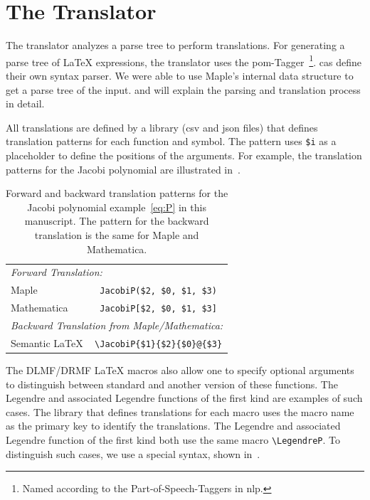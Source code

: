 \documentclass[a4paper,11pt]{article}
\newcommand{\DLMF}{DLMF}
\newcommand{\DRMF}{DRMF}
\newcommand{\Maple}{Maple}
\newcommand{\Mathematica}{Mathematica}
\newcommand{\Macro}{\DLMF/\DRMF{} \LaTeX{} macro}
\theoremstyle{defTheoStyle}
\theoremstyle{defExampStyle}
\begin{document}
\section{The Translator}
The translator analyzes a parse tree to perform translations. For generating a parse tree of \LaTeX{} expressions, the translator uses the \gls*{pom}-Tagger~\parencite{POM-Tagger}\footnote{Named according to the Part-of-Speech-Taggers in \gls*{nlp}.}. \gls*{cas} define their own syntax parser. We were able to use \Maple's internal data structure to get a parse tree of the input.  and  will explain the parsing and translation process in detail.

All translations are defined by a library (\gls*{csv} and \gls*{json} files) that defines translation patterns for each function and symbol. The pattern uses \verb|$i| as a placeholder to define the positions of the arguments. For example, the translation patterns for the Jacobi polynomial are illustrated in~.

\begin{table}[ht]
	\centering
	\begin{tabular}{lc}
		\hline
		\multicolumn{2}{l}{\textit{Forward Translation:}} \\
		\Maple & \verb|JacobiP($2, $0, $1, $3)| \\
		\Mathematica & \verb|JacobiP[$2, $0, $1, $3]|\\
		\hline
		\multicolumn{2}{l}{\textit{Backward Translation from \Maple/\Mathematica:}} \\
		Semantic \LaTeX & \verb|\JacobiP{$1}{$2}{$0}@{$3}|\\
		\hline
	\end{tabular}
	\caption{Forward and backward translation patterns for the Jacobi polynomial example~\eqref{eq:P} in this manuscript. The pattern for the backward translation is the same for \Maple{} and \Mathematica.}
	\label{tab:placeholder_ex2}
\end{table}

The \Macro s also allow one to specify optional arguments to distinguish between standard and another version of these functions. The Legendre and associated Legendre functions of the first kind are examples of such cases. The library that defines translations for each macro uses the macro name as the primary key to identify the translations. The Legendre and associated Legendre function of the first kind both use the same macro \verb|\LegendreP|. To distinguish such cases, we use a special syntax, shown in~.
\end{document}
